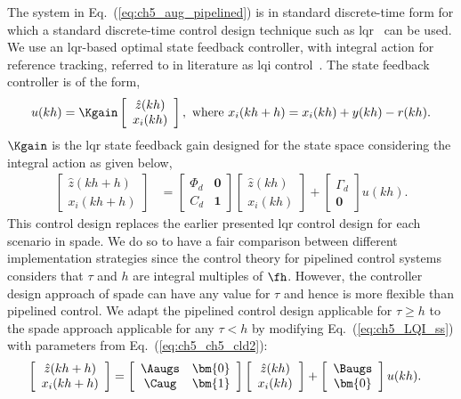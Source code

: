 The system in Eq.~(\ref{eq:ch5_aug_pipelined}) is in standard discrete-time form for which a standard discrete-time control design technique such as \gls{lqr}~\cite{dorf2011modern} can be used.
We use an \gls{lqr}-based optimal state feedback controller, with integral action for reference tracking, referred to in literature as \gls{lqi} control~\cite{zhou1996robust,young1972approach}. The state feedback controller is of the form,
\begin{eqnarray}
u(kh)=\Kgain \left[ \begin{array}{c} \hat{z}(kh) \\ x_i(kh)  \end{array} \right],\text{ where }x_i(kh+h)=x_i(kh)+y(kh)-r(kh).
\label{eq:ch5_LQI_u}
\end{eqnarray}
$\Kgain$ is the \gls{lqr} state feedback gain designed for the state space considering the integral action as given below,
\begin{eqnarray}
\left[ \begin{array}{c}\hat{z}(kh+h)\\x_i(kh+h)  \end{array} \right] &= \left[ \begin{array}{cc}\Phi_d & \bm{0}\\C_d & \bm{1}  \end{array} \right]\left[ \begin{array}{c}\hat{z}(kh)\\x_i(kh)  \end{array} \right] + \left[ \begin{array}{c}\Gamma_d\\\bm{0}  \end{array} \right] u(kh).
\label{eq:ch5_LQI_ss}
\end{eqnarray}
This control design replaces the earlier presented \gls{lqr} control design for each scenario in \gls{spade}. We do so to have a fair comparison between different implementation strategies since the control theory for pipelined control systems considers that $\tau$ and $h$ are integral multiples of $\fh$. However, the controller design approach of \gls{spade} can have any value for $\tau$ and hence is more flexible than pipelined control. 
We adapt the pipelined control design applicable for $\tau\ge h$ to the \gls{spade} approach applicable for any $\tau<h$ by modifying Eq.~(\ref{eq:ch5_LQI_ss}) with parameters from Eq.~(\ref{eq:ch5_ch5_cld2}):
\begin{eqnarray}
\left[ \begin{array}{c}\hat{z}(kh+h)\\x_i(kh+h)  \end{array} \right] &= \left[ \begin{array}{cc}\Aaugs & \bm{0}\\ \Caug & \bm{1}  \end{array} \right]\left[ \begin{array}{c}\hat{z}(kh)\\x_i(kh)  \end{array} \right] + \left[ \begin{array}{c}\Baugs \\\bm{0}  \end{array} \right] u(kh).
\nonumber
\end{eqnarray}
